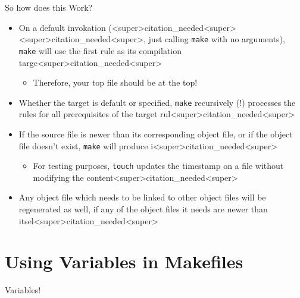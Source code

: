 \documentclass[11pt]{beamer}
\begin{document}
\begin{frame}{So how does this Work?}
\begin{itemize}
\item On a default invokation (<super>citation_needed<super><super>citation_needed<super>, just calling \texttt{make} with no arguments), \texttt{make} will use the first rule as its compilation targe<super>citation_needed<super>  
\begin{itemize}
\item Therefore, your top file should be at the top! 
\end{itemize}
\item Whether the target is default or specified, \texttt{make} recursively (!) processes the rules for all prerequisites of the target rul<super>citation_needed<super>  
\item If the source file is newer than its corresponding object file, or if the object file doesn't exist, \texttt{make} will produce i<super>citation_needed<super>
\begin{itemize}
\item For testing purposes, \texttt{touch} updates the timestamp on a file without modifying the content<super>citation_needed<super>
\end{itemize}
\item Any object file which needs to be linked to other object files will be regenerated as well, if any of the object files it needs are newer than itsel<super>citation_needed<super>  
\end{itemize}
\end{frame}

\section[Variables]{Using Variables in Makefiles}
\begin{frame}{Variables!}
\center
\
\end{frame}
\end{document}
